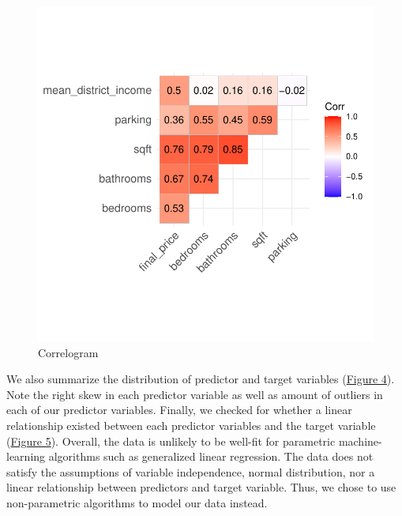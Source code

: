 \documentclass[11pt,]{article}
\begin{document}
\begin{figure}

{\centering \includegraphics{House_prices_report_files/figure-latex/corrplot-1} 

}

\caption{Correlogram\label{sec:fig3}}\label{fig:corrplot}
\end{figure}

We also summarize the distribution of predictor and target variables
(\hyperref[sec:fig4]{Figure 4}). Note the right skew in each predictor
variable as well as amount of outliers in each of our predictor
variables. Finally, we checked for whether a linear relationship existed
between each predictor variables and the target variable
(\hyperref[sec:fig5]{Figure 5}). Overall, the data is unlikely to be
well-fit for parametric machine-learning algorithms such as generalized
linear regression. The data does not satisfy the assumptions of variable
independence, normal distribution, nor a linear relationship between
predictors and target variable. Thus, we chose to use non-parametric
algorithms to model our data instead.
\end{document}
